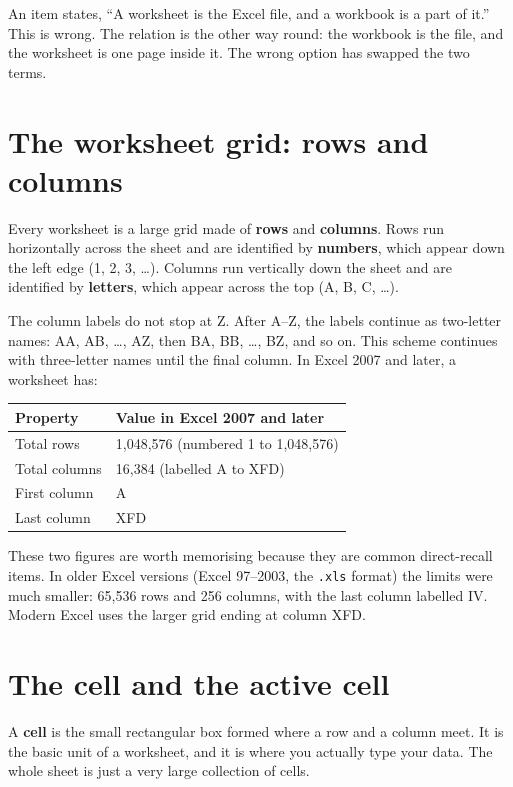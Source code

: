 \begin{example}
An item states, ``A worksheet is the Excel file, and a workbook is a part of
it.'' This is wrong. The relation is the other way round: the workbook is
the file, and the worksheet is one page inside it. The wrong option has
swapped the two terms.
\end{example}

\section{The worksheet grid: rows and columns}
Every worksheet is a large grid made of \textbf{rows} and \textbf{columns}.
Rows run horizontally across the sheet and are identified by
\textbf{numbers}, which appear down the left edge (1, 2, 3, \dots).
Columns run vertically down the sheet and are identified by
\textbf{letters}, which appear across the top (A, B, C, \dots).

The column labels do not stop at Z. After A--Z, the labels continue as
two-letter names: AA, AB, \dots, AZ, then BA, BB, \dots, BZ, and so on. This
scheme continues with three-letter names until the final column. In Excel
2007 and later, a worksheet has:

\begin{center}
\begin{tabular}{ll}
\toprule
\textbf{Property} & \textbf{Value in Excel 2007 and later} \\
\midrule
Total rows & 1,048,576 (numbered 1 to 1,048,576) \\
Total columns & 16,384 (labelled A to XFD) \\
First column & A \\
Last column & XFD \\
\bottomrule
\end{tabular}
\end{center}

These two figures are worth memorising because they are common direct-recall
items. In older Excel versions (Excel 97--2003, the \texttt{.xls} format) the
limits were much smaller: 65,536 rows and 256 columns, with the last column
labelled IV. Modern Excel uses the larger grid ending at column XFD.

\section{The cell and the active cell}
A \textbf{cell} is the small rectangular box formed where a row and a column
meet. It is the basic unit of a worksheet, and it is where you actually type
your data. The whole sheet is just a very large collection of cells.


